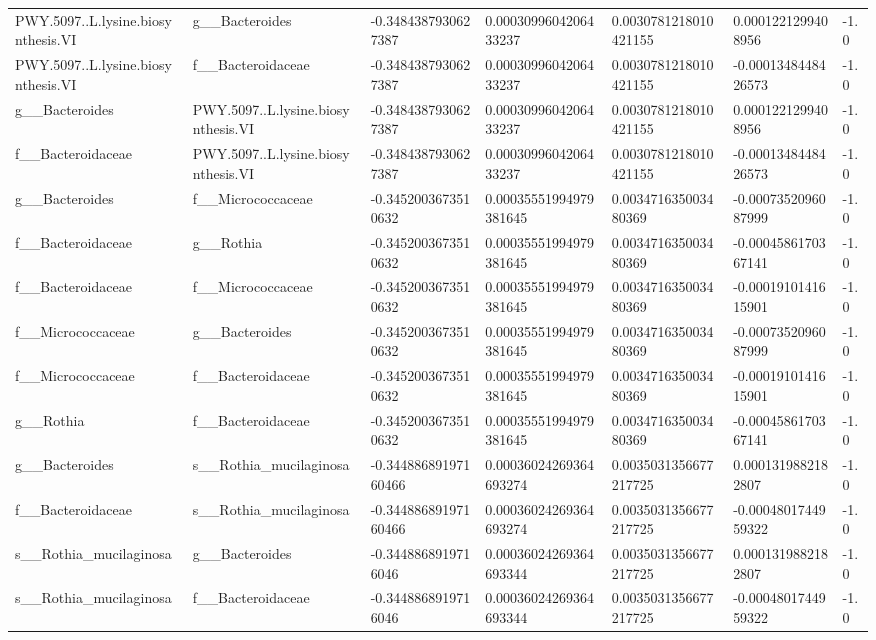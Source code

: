 \begin{longtable}{lllllll}
PWY.5097..L.lysine.biosynthesis.VI & g\_\_Bacteroides & -0.3484387930627387 & 0.0003099604206433237 & 0.0030781218010421155 & 0.0001221299408956 & -1.0 \\
PWY.5097..L.lysine.biosynthesis.VI & f\_\_Bacteroidaceae & -0.3484387930627387 & 0.0003099604206433237 & 0.0030781218010421155 & -0.0001348448426573 & -1.0 \\
g\_\_Bacteroides & PWY.5097..L.lysine.biosynthesis.VI & -0.3484387930627387 & 0.0003099604206433237 & 0.0030781218010421155 & 0.0001221299408956 & -1.0 \\
f\_\_Bacteroidaceae & PWY.5097..L.lysine.biosynthesis.VI & -0.3484387930627387 & 0.0003099604206433237 & 0.0030781218010421155 & -0.0001348448426573 & -1.0 \\
g\_\_Bacteroides & f\_\_Micrococcaceae & -0.3452003673510632 & 0.00035551994979381645 & 0.003471635003480369 & -0.0007352096087999 & -1.0 \\
f\_\_Bacteroidaceae & g\_\_Rothia & -0.3452003673510632 & 0.00035551994979381645 & 0.003471635003480369 & -0.0004586170367141 & -1.0 \\
f\_\_Bacteroidaceae & f\_\_Micrococcaceae & -0.3452003673510632 & 0.00035551994979381645 & 0.003471635003480369 & -0.0001910141615901 & -1.0 \\
f\_\_Micrococcaceae & g\_\_Bacteroides & -0.3452003673510632 & 0.00035551994979381645 & 0.003471635003480369 & -0.0007352096087999 & -1.0 \\
f\_\_Micrococcaceae & f\_\_Bacteroidaceae & -0.3452003673510632 & 0.00035551994979381645 & 0.003471635003480369 & -0.0001910141615901 & -1.0 \\
g\_\_Rothia & f\_\_Bacteroidaceae & -0.3452003673510632 & 0.00035551994979381645 & 0.003471635003480369 & -0.0004586170367141 & -1.0 \\
g\_\_Bacteroides & s\_\_Rothia\_mucilaginosa & -0.34488689197160466 & 0.00036024269364693274 & 0.0035031356677217725 & 0.0001319882182807 & -1.0 \\
f\_\_Bacteroidaceae & s\_\_Rothia\_mucilaginosa & -0.34488689197160466 & 0.00036024269364693274 & 0.0035031356677217725 & -0.0004801744959322 & -1.0 \\
s\_\_Rothia\_mucilaginosa & g\_\_Bacteroides & -0.3448868919716046 & 0.00036024269364693344 & 0.0035031356677217725 & 0.0001319882182807 & -1.0 \\
s\_\_Rothia\_mucilaginosa & f\_\_Bacteroidaceae & -0.3448868919716046 & 0.00036024269364693344 & 0.0035031356677217725 & -0.0004801744959322 & -1.0 \\

\end{longtable}
